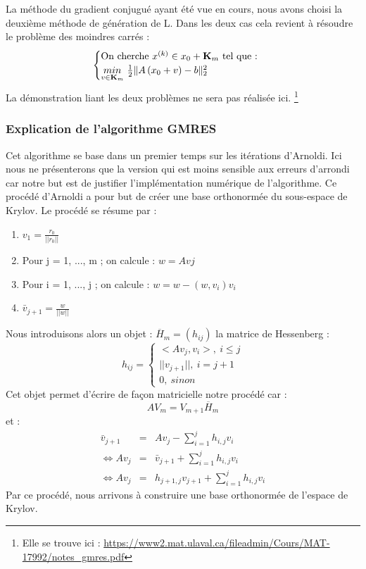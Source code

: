 La méthode du gradient conjugué ayant été vue en cours, nous avons choisi la deuxième méthode de génération de L. Dans les deux cas cela revient à résoudre le problème des moindres carrés : 
\begin{equation}
\begin{cases}
\text{On cherche $x^{(k)} \in x_0 + \mathbf{K}_m$ tel que : }\\
\underset{v \in \mathbf{K}_m}{min} \ \frac{1}{2}\|A \left(x_0 + v\right) - b\|^2_2
\end{cases}
 \label{moindrecarre}
\end{equation}
La démonstration liant les deux problèmes ne sera pas réalisée ici. \footnote{Elle se trouve ici : \url{https://www2.mat.ulaval.ca/fileadmin/Cours/MAT-17992/notes_gmres.pdf}}
\subsubsection{Explication de l'algorithme GMRES}
Cet algorithme se base dans un premier temps sur les itérations d'Arnoldi. Ici nous ne présenterons que la version qui est moins sensible aux erreurs d'arrondi car notre but est de justifier l'implémentation numérique de l'algorithme. Ce procédé d'Arnoldi a pour but de créer une base orthonormée du sous-espace de Krylov. Le procédé se résume par : 
\begin{enumerate}
	\item $v_1 = \frac{r_0}{||r_0||}$
	\item Pour j = 1, ..., m ; on calcule : $w = Avj$
	\item Pour i = 1, ..., j ; on calcule : $w = w - (w, v_i) v_i$
	\item $\bar{v}_{j+1} = \frac{w}{||w||}$
\end{enumerate}

Nous introduisons alors un objet : $\overline{H}_m = (h_{ij})$ la matrice de Hessenberg : 
\begin{equation}
h_{ij} = \begin{cases}
<Av_j, v_i>, \ i\leq j \\
||v_{j+1}||, \ i = j + 1 \\
0, \ sinon
\end{cases}
\end{equation}
Cet objet permet d'écrire de façon matricielle notre procédé car  : 
\begin{equation}
AV_m = V_{m+1}\overline{H}_m
\end{equation}
et : 
\begin{eqnarray}
\bar{v}_{j+1} &=& Av_j - \sum_{i=1}^{j} h_{i,j} v_i\\
\Leftrightarrow Av_j &=& \bar{v}_{j+1} + \sum_{i=1}^{j} h_{i,j} v_i \\
\Leftrightarrow Av_j &=& h_{j+1, j}v_{j+1} + \sum_{i=1}^{j} h_{i,j} v_i
\end{eqnarray}
Par ce  procédé, nous arrivons à construire une base orthonormée de l'espace de Krylov.\\

